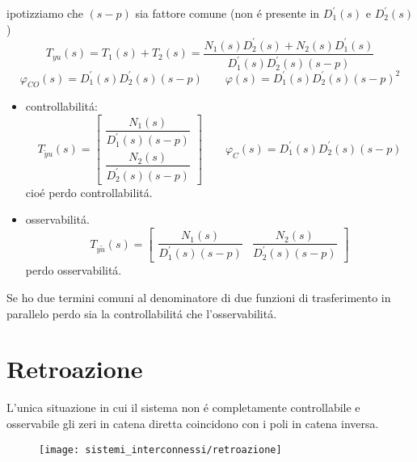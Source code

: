 \documentclass[../main.tex]{subfiles}
\begin{document}
\begin{itemize}
				ipotizziamo che $ (s-p) $ sia fattore comune (non \'e presente in $ D_1^{'}(s) $ e $ D_2^{'}(s) $)
				\[
					T_{yu}(s) = T_1(s) + T_2(s) = 
					\dfrac{N_1(s)D_2^{'}(s) + N_2(s)D_1^{'}(s)}{D_1^{'}(s) D_2^{'}(s) (s-p)}
				\]
				\[
					\varphi_{CO}(s) = D_1^{'}(s) D_2^{'}(s) (s-p) \qquad \varphi(s) = D_1^{'}(s) D_2^{'}(s) (s-p)^2
				\]
				\begin{itemize}
					\item 
						controllabilit\'a:
						\[
							T_{\tilde y u}(s) =
							\begin{bmatrix}
								\dfrac{N_1(s)}{D_1^{'}(s) (s-p)}\\
								\dfrac{N_2(s)}{D_2^{'}(s) (s-p)}
							\end{bmatrix}
							\qquad
							\varphi_C(s) = D_1^{'}(s) D_2^{'}(s) (s-p)
						\]
						cio\'e perdo controllabilit\'a.
					\item 
						osservabilit\'a.
						\[
							T_{y \tilde u}(s) = 
							\begin{bmatrix}
								\dfrac{N_1(s)}{D_1^{'}(s) (s-p)} &
								\dfrac{N_2(s)}{D_2^{'}(s) (s-p)}
							\end{bmatrix}
						\]
						perdo osservabilit\'a.
				\end{itemize}
			Se ho due termini comuni al denominatore di due funzioni di trasferimento in parallelo perdo sia la controllabilit\'a che l'osservabilit\'a.
		\end{itemize}
	
	\section{Retroazione}
		L'unica situazione in cui il sistema non \'e completamente controllabile e osservabile gli zeri in catena diretta coincidono con i poli in catena inversa.
		\begin{figure}[h!]
			\centering\texttt{[image: sistemi\_interconnessi/retroazione]}
		\end{figure}
	
\end{document}
